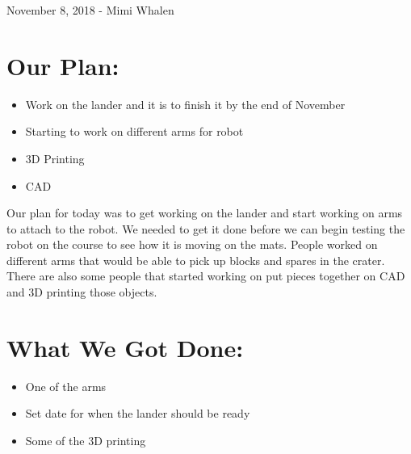 \documentclass[12pt]{article}
\begin{document}
\newpage
\setcounter{section}{0}

November 8, 2018 - Mimi Whalen

\section{Our Plan:} %
\begin{itemize}
	\item Work on the lander and it is to finish it by the end of November
	\item Starting to work on different arms for robot
\item 3D Printing
\item CAD
\end{itemize}

Our plan for today was to get working on the lander and start working on arms to attach to the robot. We needed to get it done before we can begin testing the robot on the course to see how it is moving on the mats. People worked on different arms that would be able to pick up blocks and spares in the crater. There are also some people that started working on put pieces together on CAD and 3D printing those objects.

\section{What We Got Done:} %
\begin{itemize}
	\item One of the arms 
	\item Set date for when the lander should be ready
	\item Some of the 3D printing
\end{itemize}

\end{document}
